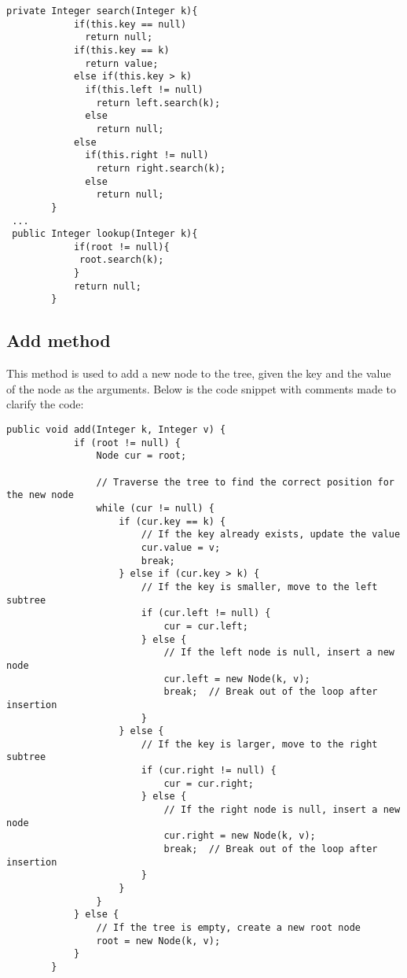 \documentclass[a4paper,11pt]{article}
\begin{document}
\begin{verbatim}
private Integer search(Integer k){
            if(this.key == null)
              return null;
            if(this.key == k)
              return value;
            else if(this.key > k)
              if(this.left != null)
                return left.search(k);
              else 
                return null;
            else 
              if(this.right != null)
                return right.search(k);
              else 
                return null;
        }
 ...
 public Integer lookup(Integer k){
            if(root != null){
             root.search(k);
            }
            return null;
        }
\end{verbatim}

\subsection*{Add method}
This method is used to add a new node to the tree, given the key and the value of the node as the arguments. Below is the code snippet with comments made to clarify the code:

\begin{verbatim}
public void add(Integer k, Integer v) {
            if (root != null) {
                Node cur = root;
        
                // Traverse the tree to find the correct position for the new node
                while (cur != null) {
                    if (cur.key == k) {
                        // If the key already exists, update the value
                        cur.value = v;
                        break;
                    } else if (cur.key > k) {
                        // If the key is smaller, move to the left subtree
                        if (cur.left != null) {
                            cur = cur.left;
                        } else {
                            // If the left node is null, insert a new node
                            cur.left = new Node(k, v);
                            break;  // Break out of the loop after insertion
                        }
                    } else {
                        // If the key is larger, move to the right subtree
                        if (cur.right != null) {
                            cur = cur.right;
                        } else {
                            // If the right node is null, insert a new node
                            cur.right = new Node(k, v);
                            break;  // Break out of the loop after insertion
                        }
                    }
                }
            } else {
                // If the tree is empty, create a new root node
                root = new Node(k, v);
            }
        }
\end{verbatim}
\end{document}
